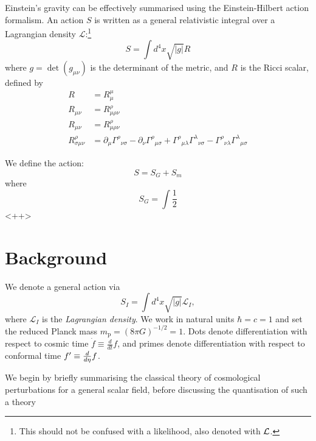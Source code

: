Einstein's gravity can be effectively summarised using the Einstein-Hilbert action formalism. An action $S$ is written as a general relativistic integral over a Lagrangian density $\mathcal{L}$:\footnote{This should not be confused with a likelihood, also denoted with $\mathcal{L}$.}
\begin{equation}
  S = \int d^4 x \sqrt{|g|} R
  \label{eqn:cos:action}
\end{equation}
where $g=\det(g_{\mu\nu})$ is the determinant of the metric, and $R$ is the Ricci scalar, defined by
\begin{align}
  R &= R^\mu_\mu \label{eqn:cos:ricci_scalar_def} \\
  R_{\mu\nu} &= R^\rho_{\mu\rho\nu} \label{eqn:cos:ricci_tensor_def} \\
  R_{\mu\nu} &= R^\rho_{\mu\rho\nu} \label{eqn:cos:riemann_tensor_def} \\
  R^\rho_{\sigma\mu\nu} &= \partial_\mu\Gamma^\rho{}_{\nu\sigma}
    - \partial_\nu\Gamma^\rho{}_{\mu\sigma}
    + \Gamma^\rho{}_{\mu\lambda}\Gamma^\lambda{}_{\nu\sigma}
    - \Gamma^\rho{}_{\nu\lambda}\Gamma^\lambda{}_{\mu\sigma}
\end{align}

We define the action:
\begin{equation}
  S = S_G + S_m
  \label{eqn:cos:action}
\end{equation}
where
\begin{equation}
  S_G = \int \frac{1}{2}
  \label{<++>}
\end{equation}<++>

\section{Background}
\label{sec:background}

\clearpage{}

We denote a general action via
\begin{equation}
  S_I = \int d^4x\sqrt{|g|}\mathcal{L}_I,
  \label{eqn:general_action}
\end{equation}
where $\mathcal{L}_I$ is the {\em Lagrangian density}. We work in natural units $\hbar=c=1$ and set the reduced Planck mass $m_\mathrm{p} = {(8\pi G)}^{-1/2} = 1$. Dots denote differentiation with respect to cosmic time $\dot{f}\equiv \frac{d}{dt}f$, and primes denote differentiation with respect to conformal time ${{f}^\prime}\equiv\frac{d}{d\eta}f$.

We begin by briefly summarising the classical theory of cosmological perturbations for a general scalar field, before discussing the quantisation of such a theory


